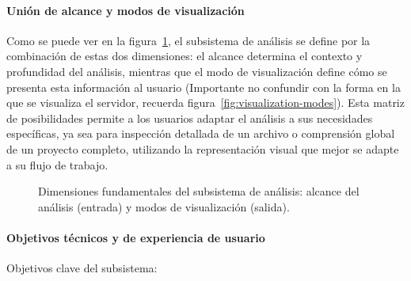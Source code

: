 \documentclass[a4paper, 12pt]{book}
\begin{document}
\paragraph{Unión de alcance y modos de visualización}
Como se puede ver en la figura~\ref{fig:analisis-dimensiones}, el subsistema de análisis se define por la combinación de estas dos dimensiones: el alcance determina el contexto y profundidad del análisis, mientras que el modo de visualización define cómo se presenta esta información al usuario (Importante no confundir con la forma en la que se visualiza el servidor, recuerda figura~\ref{fig:visualization-modes}). Esta matriz de posibilidades permite a los usuarios adaptar el análisis a sus necesidades específicas, ya sea para inspección detallada de un archivo o comprensión global de un proyecto completo, utilizando la representación visual que mejor se adapte a su flujo de trabajo.

\begin{figure}[H]
\centering
{}
\caption{Dimensiones fundamentales del subsistema de análisis: alcance del análisis (entrada) y modos de visualización (salida).}
\label{fig:analisis-dimensiones}
\end{figure}

\paragraph{Objetivos técnicos y de experiencia de usuario}
Objetivos clave del subsistema:
\end{document}
